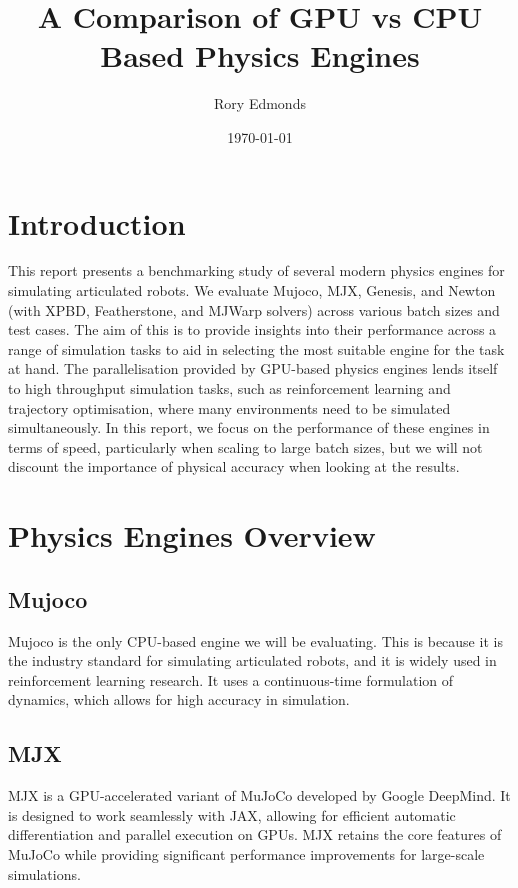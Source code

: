 \documentclass[11pt,a4paper]{article}
\title{A Comparison of GPU vs CPU Based Physics Engines}
\author{Rory Edmonds}
\date{\today}
\begin{document}
\maketitle



\section{Introduction}
This report presents a benchmarking study of several modern physics engines for simulating articulated robots. We evaluate Mujoco, MJX, Genesis, and Newton (with XPBD, Featherstone, and MJWarp solvers) across various batch sizes and test cases. The aim of this is to provide insights into their performance across a range of simulation tasks to aid in selecting the most suitable engine for the task at hand. The parallelisation provided by GPU-based physics engines lends itself to high throughput simulation tasks, such as reinforcement learning and trajectory optimisation, where many environments need to be simulated simultaneously. In this report, we focus on the performance of these engines in terms of speed, particularly when scaling to large batch sizes, but we will not discount the importance of physical accuracy when looking at the results.

\section{Physics Engines Overview}
\subsection{Mujoco}
Mujoco is the only CPU-based engine we will be evaluating. This is because it is the industry standard for simulating articulated robots, and it is widely used in reinforcement learning research. It uses a continuous-time formulation of dynamics, which allows for high accuracy in simulation. 
\subsection{MJX}
MJX is a GPU-accelerated variant of MuJoCo developed by Google DeepMind. It is designed to work seamlessly with JAX, allowing for efficient automatic differentiation and parallel execution on GPUs. MJX retains the core features of MuJoCo while providing significant performance improvements for large-scale simulations.
\end{document}

